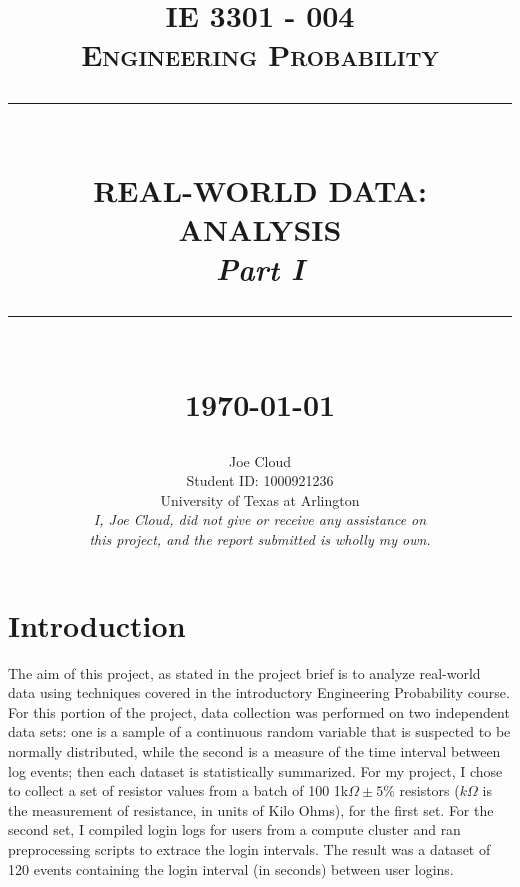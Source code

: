 \documentclass[10pt]{report}
\newcommand{\HRule}[1]{\rule{\linewidth}{#1}}
\begin{document}
\title{ \normalsize \textsc{IE 3301 - 004 \\ Engineering Probability}
        \\ [2.0cm]
        \HRule{0.5pt} \\
        \LARGE \textbf{\uppercase{Real-World Data: Analysis}} \\
        \normalsize \textit{Part I}
        \HRule{2pt} \\ [0.5cm]
        \normalsize \today \vspace*{5\baselineskip}}

\date{}

\author{
    Joe Cloud \\
        Student ID: 1000921236 \\
        University of Texas at Arlington \\[1in]
        \textit{I, Joe Cloud, did not give or receive any assistance on }\\
        \textit{this project, and the report submitted is wholly my own.}}



    \maketitle
\tableofcontents
\newpage

\sectionfont{\scshape}

\section*{Introduction}

The aim of this project, as stated in the project brief is to analyze real-world
data using techniques covered in the introductory Engineering Probability course. 
For this portion of the project, data collection was performed on two independent 
data sets: one is a sample of a continuous random variable that is suspected to be 
normally distributed, while the second is a measure of the time interval between log events; 
then each dataset is statistically summarized.  
For my project, I chose to collect a set of resistor values from a batch of 100 
1k$\Omega \pm 5\%$ resistors ($k\Omega$ is the measurement of resistance, in units of Kilo Ohms), 
for the first set. For the second set, I compiled login logs for users from a compute cluster and 
ran preprocessing scripts to extrace the login intervals.
The result was a dataset of 120 events containing the login interval (in seconds) between user logins.
\end{document}
